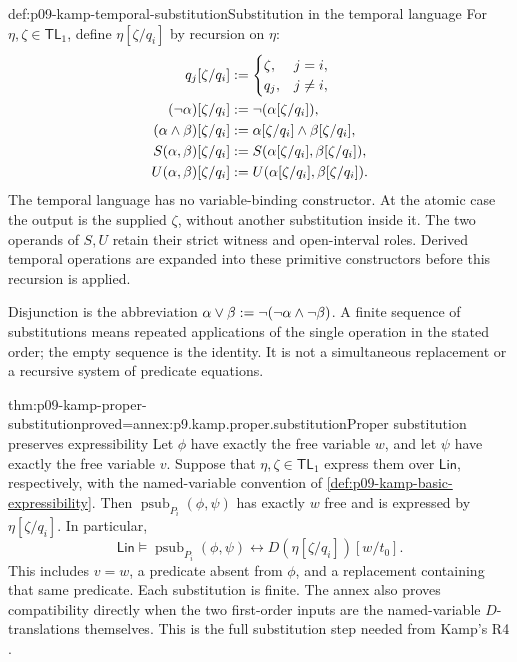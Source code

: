 \begin{hbdefinition}{def:p09-kamp-temporal-substitution}{Substitution in the temporal language}
For \(\eta,\zeta\in\mathsf{TL}_1\), define
\(\eta[\zeta/q_i]\) by recursion on \(\eta\):
\[
\begin{aligned}
 q_j[\zeta/q_i]&\mathrel{:=}
   \begin{cases}\zeta,&j=i,\\q_j,&j\ne i,\end{cases}\\
 (\neg\alpha)[\zeta/q_i]&\mathrel{:=}\neg(\alpha[\zeta/q_i]),\\
 (\alpha\land\beta)[\zeta/q_i]
   &\mathrel{:=}\alpha[\zeta/q_i]\land\beta[\zeta/q_i],\\
 S(\alpha,\beta)[\zeta/q_i]
   &\mathrel{:=} S(\alpha[\zeta/q_i],\beta[\zeta/q_i]),\\
 U(\alpha,\beta)[\zeta/q_i]
   &\mathrel{:=} U(\alpha[\zeta/q_i],\beta[\zeta/q_i]).
\end{aligned}
\]
The temporal language has no variable-binding constructor. At the atomic
case the output is the supplied \(\zeta\), without another substitution
inside it. The two operands of \(S,U\) retain their strict witness and
open-interval roles. Derived temporal operations are expanded into these
primitive constructors before this recursion is applied.

Disjunction is the abbreviation
\(\alpha\lor\beta\mathrel{:=}\neg(\neg\alpha\land\neg\beta)\).
A finite sequence of substitutions means repeated applications of the
single operation in the stated order; the empty sequence is the identity.
It is not a simultaneous replacement or a recursive system of predicate
equations.
\end{hbdefinition}

\begin{hblemma}{thm:p09-kamp-proper-substitution}{proved=annex:p9.kamp.proper.substitution}{Proper substitution preserves expressibility}
Let \(\phi\) have exactly the free variable \(w\), and let
\(\psi\) have exactly the free variable \(v\). Suppose that
\(\eta,\zeta\in\mathsf{TL}_1\) express them over
\(\mathsf{Lin}\), respectively, with the named-variable convention of
\cref{def:p09-kamp-basic-expressibility}. Then
\(\operatorname{psub}_{P_i}(\phi,\psi)\) has exactly \(w\) free and
is expressed by \(\eta[\zeta/q_i]\). In particular,
\[
 \mathsf{Lin}\models
 \operatorname{psub}_{P_i}(\phi,\psi)
 \longleftrightarrow D(\eta[\zeta/q_i])[w/t_0].
\]
This includes \(v=w\), a predicate absent from \(\phi\), and a
replacement containing that same predicate. Each substitution is finite.
The annex also proves compatibility directly when the two first-order
inputs are the named-variable \(D\)-translations themselves. This is the
full substitution step needed from Kamp's R4
\cite[ch.~III, pp.~59--60]{Kamp1968}.
\end{hblemma}

